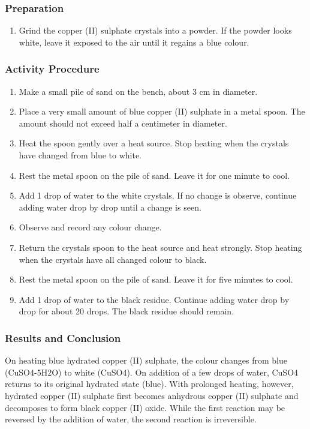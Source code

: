 \subsubsection*{Preparation}
\begin{enumerate}
\item{Grind the copper (II) sulphate crystals into a powder. If the powder looks white, leave it exposed to the air until it regains a blue colour.}
\end{enumerate}

\subsubsection*{Activity Procedure}
\begin{enumerate}
\item{Make a small pile of sand on the bench, about 3 cm in diameter.}
\item{Place a very small amount of blue copper (II) sulphate in a metal spoon. The amount should not exceed half a centimeter in diameter.}
\item{Heat the spoon gently over a heat source. Stop heating when the crystals have changed from blue to white.}
\item{Rest the metal spoon on the pile of sand. Leave it for one minute to cool.}
\item{Add 1 drop of water to the white crystals. If no change is observe, continue adding water drop by drop until a change is seen.}
\item{Observe and record any colour change.}
\item{Return the crystals spoon to the heat source and heat strongly. Stop heating when the crystals have all changed colour to black.}
\item{Rest the metal spoon on the pile of sand. Leave it for five minutes to cool.}
\item{Add 1 drop of water to the black residue. Continue adding water drop by drop for about 20 drops. The black residue should remain.}
\end{enumerate}

\subsubsection*{Results and Conclusion}
On heating blue hydrated copper (II) sulphate, the colour changes from blue (CuSO4-5H2O) to white (CuSO4). On addition of a few drops of water, CuSO4 returns to its original hydrated state (blue). With prolonged heating, however, hydrated copper (II) sulphate first becomes anhydrous copper (II) sulphate and decomposes to form black copper (II) oxide. While the first reaction may be reversed by the addition of water, the second reaction is irreversible.

